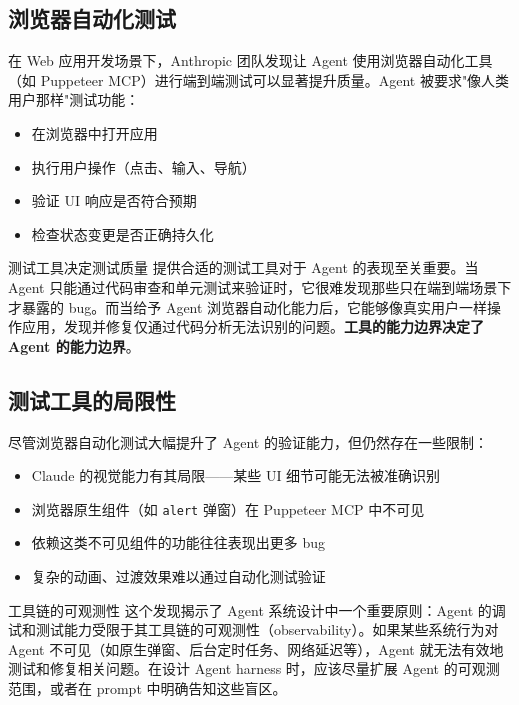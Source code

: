 \documentclass[a4paper]{article}
\begin{document}
\subsection{浏览器自动化测试}

在 Web 应用开发场景下，Anthropic 团队发现让 Agent 使用浏览器自动化工具（如 Puppeteer MCP）进行端到端测试可以显著提升质量。Agent 被要求"像人类用户那样"测试功能：

\begin{itemize}
    \item 在浏览器中打开应用
    \item 执行用户操作（点击、输入、导航）
    \item 验证 UI 响应是否符合预期
    \item 检查状态变更是否正确持久化
\end{itemize}

\begin{importantbox}{测试工具决定测试质量}
提供合适的测试工具对于 Agent 的表现至关重要。当 Agent 只能通过代码审查和单元测试来验证时，它很难发现那些只在端到端场景下才暴露的 bug。而当给予 Agent 浏览器自动化能力后，它能够像真实用户一样操作应用，发现并修复仅通过代码分析无法识别的问题。\textbf{工具的能力边界决定了 Agent 的能力边界}。
\end{importantbox}

\subsection{测试工具的局限性}

尽管浏览器自动化测试大幅提升了 Agent 的验证能力，但仍然存在一些限制：

\begin{itemize}
    \item Claude 的视觉能力有其局限——某些 UI 细节可能无法被准确识别
    \item 浏览器原生组件（如 \texttt{alert} 弹窗）在 Puppeteer MCP 中不可见
    \item 依赖这类不可见组件的功能往往表现出更多 bug
    \item 复杂的动画、过渡效果难以通过自动化测试验证
\end{itemize}

\begin{knowledgebox}{工具链的可观测性}
这个发现揭示了 Agent 系统设计中一个重要原则：Agent 的调试和测试能力受限于其工具链的可观测性（observability）。如果某些系统行为对 Agent 不可见（如原生弹窗、后台定时任务、网络延迟等），Agent 就无法有效地测试和修复相关问题。在设计 Agent harness 时，应该尽量扩展 Agent 的可观测范围，或者在 prompt 中明确告知这些盲区。
\end{knowledgebox}
\end{document}
